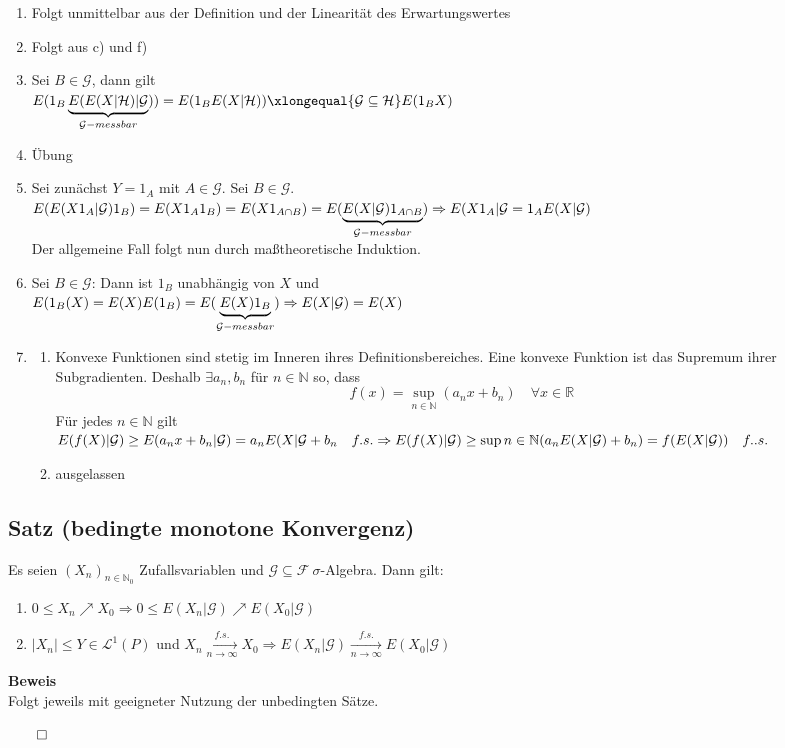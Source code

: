 \documentclass[german,10pt,oneside, fleqn, a4paper]{article}
\newcommand {\R}	{\mathbb{R}}
\newcommand {\N}	{\mathbb{N}}
\newcommand{\Ra}	{\Rightarrow}
\newcommand{\folge}[3][\N]{\left(#2_#3\right)_{#3\in #1}}
\newcommand{\QED}{\begin{flushright}$\qed$\end{flushright}}
\newcommand{\mc}[1]{\mathcal{#1}}
\newcommand{\lp}[1]{\mc{L}^{#1}}
\newcommand{\beweis}{\textbf{Beweis}\\}
\newcommand{\toinf}{\rightarrow\infty}
\newcommand{\1}[1]{1_{#1}}
\newcommand{\2}[1]{\1{\brac{#1}}}
\newcommand{\xr}[2][]{\xrightarrow[#1]{#2}}
\newcommand{\g}{\mc{G}}
\newcommand{\f}{\mc{F}}
\begin{document}
\begin{enumerate}[label=(\alph*)]
\item Folgt unmittelbar aus der Definition und der Linearität des Erwartungswertes
\item Folgt aus c) und f)
\item Sei $B\in\g$, dann gilt\\
$E(1_B\underbrace{E(E(X|\mc{H})|\g}_{\g-messbar}))=E(1_BE(X|\mc{H}))\xlongequal{\g\subseteq\mc{H}}E(1_BX)$
\item Übung
\item Sei zunächst $Y=1_A$ mit $A\in\g$. Sei $B\in\g$.\\
$E(E(X1_A|\g)1_B)=E(X1_A1_B)=E(X1_{A\cap B})=E(\underbrace{E(X|\g)1_{A\cap B}}_{\mc{G}-messbar})\\
\Ra E(X1_A|\mc{G}=1_AE(X|\mc{G})$\\
Der allgemeine Fall folgt nun durch maßtheoretische Induktion.
\item Sei $B\in\mc{G}$: Dann ist $1_B$ unabhängig von $X$ und\\
$E(1_B(X)=E(X)E(1_B)=E(\underbrace{E(X)1_B}_{\mc{G}-messbar})\\
\Ra E(X|\mc{G})=E(X)$
\item \begin{enumerate}[label=(\roman*)]
	\item Konvexe Funktionen sind stetig im Inneren ihres Definitionsbereiches. Eine konvexe Funktion ist das Supremum ihrer Subgradienten. Deshalb $\exists a_n,b_n$ für $n\in\N$ so, dass \[
	f(x)=\sup\limits_{n\in\N}(a_nx+b_n)\quad\forall x\in\R\]
Für jedes $n\in\N$ gilt\\
$E(f(X)|\mc{G})\geq E(a_nx+b_n|\mc{G})=a_nE(X|\mc{G}+b_n\quad f.s.\\
\Ra E(f(X)|\mc{G})\geq\sup\limits{n\in\N}(a_nE(X|\mc{G})+b_n)=f(E(X|\mc{G}))\quad f..s.$
\item ausgelassen
\end{enumerate}
\end{enumerate}






\subsection{Satz (bedingte monotone Konvergenz)}
\label{6.3}
Es seien $\folge[\N_0]{X}{n}$ Zufallsvariablen und $\g\subseteq\f\ \sigma$-Algebra. Dann gilt: \begin{enumerate}[label=(\alph*)]
\item $0\leq X_n\nearrow X_0\Ra 0\leq E(X_n|\g)\nearrow E(X_0|\g)$
\item $|X_n|\leq Y\in\lp{1}(P)$ und $X_n\xr[n\toinf]{f.s.}X_0\Ra E(X_n|\g)\xr[n\toinf]{f.s.}E(X_0|\g)$\\
\end{enumerate}
\beweis
Folgt jeweils mit geeigneter Nutzung der unbedingten Sätze.\QED
\end{document}
